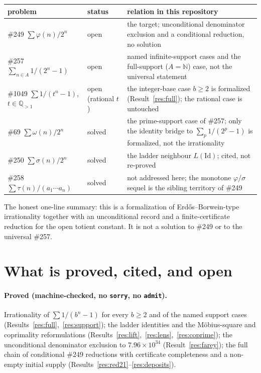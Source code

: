 \documentclass[11pt]{article}
\theoremstyle{definition}
\theoremstyle{remark}
\newcommand{\N}{\mathbb{N}}
\newcommand{\Q}{\mathbb{Q}}
\newcommand{\ph}{\varphi}
\begin{document}
\begin{center}
\begin{tabular}{@{}p{3.4cm}p{2.4cm}p{7.6cm}@{}}
\toprule
problem & status & relation in this repository\\
\midrule
\#249 $\sum\ph(n)/2^n$ & open & the target; unconditional denominator exclusion and a conditional reduction, no solution\\
\#257 $\sum_{n\in A}1/(2^n-1)$ & open & named infinite-support cases and the full-support ($A=\N$) case, not the universal statement\\
\#1049 $\sum 1/(t^n-1)$, $t\in\Q_{>1}$ & open (rational $t$) & the integer-base case $b\ge2$ is formalized (Result~\ref{res:full}); the rational case is untouched\\
\#69 $\sum\omega(n)/2^n$ & solved~\cite{taoterv} & the prime-support case of \#257; only the identity bridge to $\sum_p 1/(2^p-1)$ is formalized, not the irrationality\\
\#250 $\sum\sigma(n)/2^n$ & solved~\cite{nesterenko} & the ladder neighbour $L(\mathrm{Id})$; cited, not re-proved\\
\#258 $\sum\tau(n)/(a_1\cdots a_n)$ & solved & not addressed here; the monotone $\ph$/$\sigma$ sequel is the sibling territory of \#249\\
\bottomrule
\end{tabular}
\end{center}

The honest one-line summary: this is a formalization of Erd\H{o}s--Borwein-type
irrationality together with an unconditional record and a finite-certificate
reduction for the open totient constant. It is not a solution to \#249 or to the
universal \#257.

\section{What is proved, cited, and open}\label{sec:boundary}

\paragraph{Proved (machine-checked, no \texttt{sorry}, no \texttt{admit}).}
Irrationality of $\sum 1/(b^n-1)$ for every $b\ge2$ and of the named support cases
(Results~\ref{res:full},~\ref{res:support}); the ladder identities and the
M\"obius-square and coprimality reformulations
(Results~\ref{res:lift},~\ref{res:lens},~\ref{res:coprime}); the unconditional
denominator exclusion to $7.96\times10^{34}$ (Result~\ref{res:farey}); the full
chain of conditional \#249 reductions with certificate completeness and a
non-empty initial supply (Results~\ref{res:red21}--\ref{res:deposits}).
\end{document}
